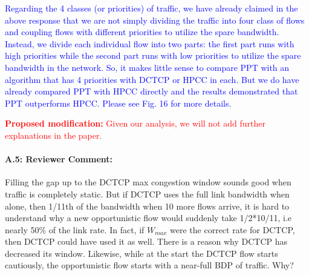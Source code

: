 \documentclass[12pt,one-column]{article}
\begin{document}
\textcolor{blue}{Regarding the 4 classes (or priorities) of traffic, we have already claimed in the above response that we are not simply dividing the traffic into four class of flows and coupling flows with different priorities to utilize the spare bandwidth. Instead, we divide each individual flow into two parts: the first part runs with high priorities while the second part runs with low priorities to utilize the spare bandwidth in the network. 
So, it makes little sense to compare PPT with an algorithm that has 4 priorities with DCTCP or HPCC in each.
But we do have already compared PPT with HPCC directly and the results demonstrated that PPT outperforms HPCC. Please see Fig. 16 for more details. }

\noindent\textcolor{red}{\textbf{Proposed modification: }
Given our analysis, we will not add further explanations in the paper.
}





{\it \paragraph{A.5: Reviewer Comment:}Filling the gap up to the DCTCP max congestion window sounds good when traffic is completely static. But if DCTCP uses the full link bandwidth when alone, then 1/11th of the bandwidth when 10 more flows arrive, it is hard to understand why a new opportunistic flow would suddenly take 1/2*10/11, i.e nearly 50\% of the link rate. In fact, if $W_{max}$ were the correct rate for DCTCP, then DCTCP could have used it as well. There is a reason why DCTCP has decreased its window. Likewise, while at the start the DCTCP flow starts cautiously, the opportunistic flow starts with a near-full BDP of traffic. Why?}
\end{document}

